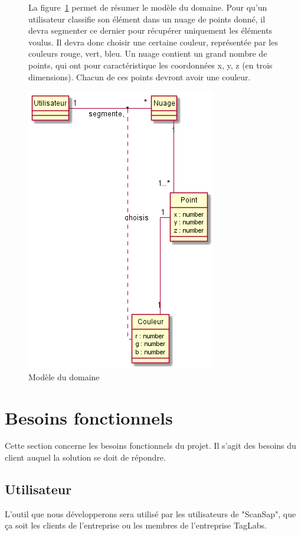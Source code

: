 \documentclass[12pt,titlepage,french]{article}
\begin{document}
\begin{figure} [!hbtp]
\begin{minipage}[c]{0.60\linewidth}
La figure~\ref{Modèle du domaine} permet de résumer le modèle du domaine. Pour qu'un utilisateur classifie son élément dans un nuage de points donné, il devra segmenter ce dernier pour récupérer uniquement les éléments voulus. Il devra donc choisir une certaine couleur, représentée par les couleurs rouge, vert, bleu. Un nuage contient un grand nombre de points, qui ont pour caractéristique les coordonnées x, y, z (en trois dimensions). Chacun de ces points devront avoir une couleur.
\end{minipage} \hfill
\begin{minipage}[c]{0.40\linewidth}
    \centering
    \caption{Modèle du domaine}
    \label{Modèle du domaine}
    \includegraphics[scale=0.60]{modele_domaine.png}
    \end{minipage}
\end{figure}

\break
\section{Besoins fonctionnels}

Cette section concerne les besoins fonctionnels du projet.
Il s'agit des besoins du client auquel la solution se doit de répondre. 

\subsection*{Utilisateur}
L'outil que nous développerons sera utilisé par les utilisateurs de "ScanSap", que ça soit les clients de l'entreprise ou les membres de l'entreprise TagLabs.
\end{document}
